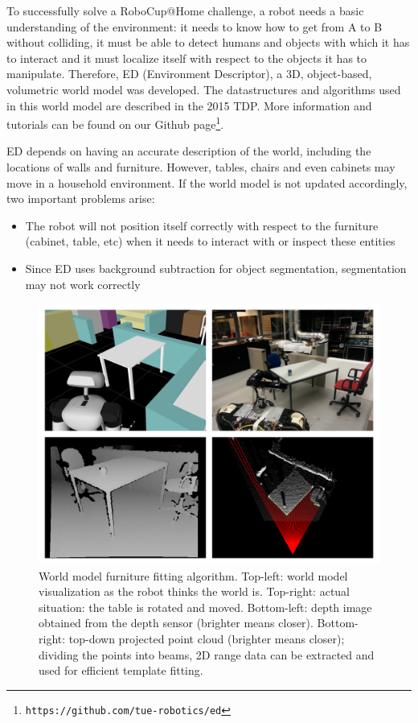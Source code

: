 To successfully solve a RoboCup@Home challenge, a robot needs a basic understanding of the environment: it needs to know how to get from A to B without colliding, it must be able to detect humans and objects with which it has to interact and it must localize itself with respect to the objects it has to manipulate. Therefore, ED (Environment Descriptor), a 3D, object-based, volumetric world model was developed. The datastructures and algorithms used in this world model are described in the 2015 TDP. More information and tutorials can be found on our Github page\footnote{\texttt{https://github.com/tue-robotics/ed}}.

ED depends on having an accurate description of the world, including the locations of walls and furniture. However, tables, chairs and even cabinets may move in a household environment. If the world model is not updated accordingly, two important problems arise:
\begin{itemize}
    \item The robot will not position itself correctly with respect to the furniture (cabinet, table, etc) when it needs to interact with or inspect these entities
    \item Since ED uses background subtraction for object segmentation, segmentation may not work correctly
\end{itemize}

\begin{figure}[ht]
        \includegraphics[width = \linewidth]{Figures/fitting}
        \caption{World model furniture fitting algorithm. Top-left: world model visualization as the robot thinks the world is. Top-right: actual situation: the table is rotated and moved. Bottom-left: depth image obtained from the depth sensor (brighter means closer). Bottom-right: top-down projected point cloud (brighter means closer); dividing the points into beams, 2D range data can be extracted and used for efficient template fitting.}
        \label{fig:fitting}
\end{figure}

